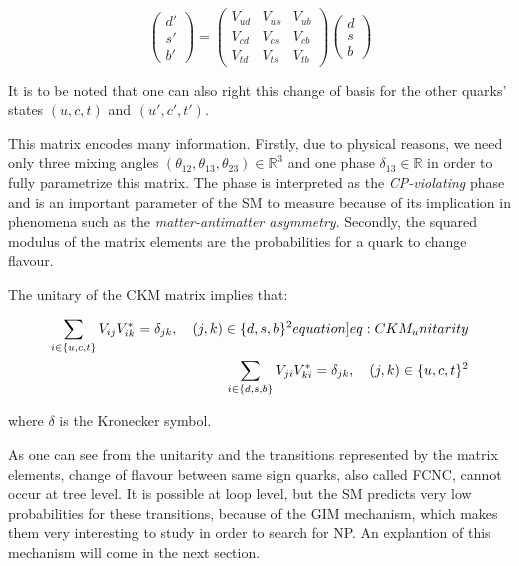 \begin{equation}
    \begin{pmatrix}
        d' \\
        s' \\
        b'
    \end{pmatrix}
    =
    \begin{pmatrix}
        V_{ud} & V_{us} & V_{ub} \\
        V_{cd} & V_{cs} & V_{cb} \\
        V_{td} & V_{ts} & V_{tb}
    \end{pmatrix}
    \begin{pmatrix}
        d \\
        s \\
        b
    \end{pmatrix}
\end{equation}

It is to be noted that one can also right this change of basis for the other quarks' states $(u, c, t)$ and $(u', c', t')$.

This matrix encodes many information.
Firstly, due to physical reasons, we need only three mixing angles $\left(\theta_{12}, \theta_{13}, \theta_{23}\right) \in \mathbb{R}^3$ and one phase $\delta_{13} \in \mathbb{R}$ in order to fully parametrize this matrix.
The phase is interpreted as the \textit{CP-violating} phase and is an important parameter of the \gls{SM} to measure because of its implication in phenomena such as the \textit{matter-antimatter asymmetry}.
Secondly, the squared modulus of the matrix elements are the probabilities for a quark to change flavour.

The unitary of the \gls{CKM} matrix implies that:

\begin{align}
    \sum_{i \in \{u, c, t\}} V_{ij}V_{ik}^* =  \delta_{jk}, \quad \left(j, k\right) \in \{d, s, b\}^2 \label[equation]{eq:CKM_unitarity} \\ 
    \sum_{i \in \{d, s, b\}} V_{ji}V_{ki}^* = \delta_{jk}, \quad \left(j, k\right) \in \{u, c, t\}^2
\end{align}

where $\delta$ is the Kronecker symbol.

As one can see from the unitarity and the transitions represented by the matrix elements, change of flavour between same sign quarks, also called \gls{FCNC}, cannot occur at tree level.
It is possible at loop level, but the \gls{SM} predicts very low probabilities for these transitions, because of the \gls{GIM} mechanism, which makes them very interesting to study in order to search for \gls{NP}.
An explantion of this mechanism will come in the next section.

